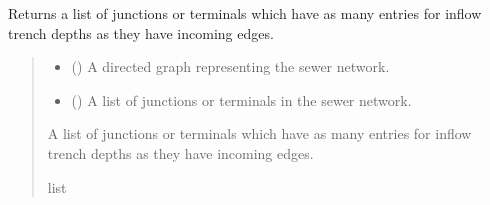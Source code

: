 \documentclass[letterpaper,10pt,english]{sphinxmanual}
\begin{document}
\begin{fulllineitems}
\label{\detokenize{pysewer:pysewer.optimization.get_junction_front}}
\pysigstartsignatures
{}
\pysigstopsignatures
\sphinxAtStartPar
Returns a list of junctions or terminals which have as many entries for inflow trench depths as they have incoming edges.
\begin{quote}\begin{description}
\begin{itemize}
\item {} 
\sphinxAtStartPar
{} () \textendash{} A directed graph representing the sewer network.

\item {} 
\sphinxAtStartPar
{} () \textendash{} A list of junctions or terminals in the sewer network.

\end{itemize}

\sphinxAtStartPar
A list of junctions or terminals which have as many entries for inflow trench depths as they have incoming edges.

\sphinxAtStartPar
list

\end{description}\end{quote}

\end{fulllineitems}

\end{document}
